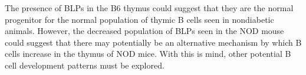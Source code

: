 The presence of BLPs in the B6 thymus could suggest that they are the normal progenitor for the normal population of thymic B cells seen in nondiabetic animals.
However, the decreased population of BLPs seen in the NOD mouse could suggest that there may potentially be an alternative mechanism by which B cells increase in the thymus of NOD mice.
With this is mind, other potential B cell development patterns must be explored.




